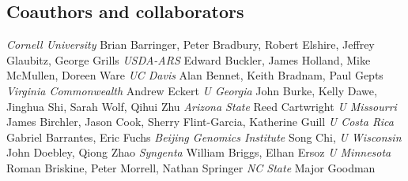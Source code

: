 \documentclass[11pt]{article}
\newcommand\e[1]{\emph{#1}}
\begin{document}
\subsection{Coauthors and collaborators}
\e{Cornell University} Brian Barringer, Peter Bradbury, Robert Elshire, Jeffrey Glaubitz, George Grills
\e{USDA-ARS} Edward Buckler, James Holland, Mike McMullen, Doreen Ware
\e{UC Davis} Alan Bennet, Keith Bradnam, Paul Gepts
\e{Virginia Commonwealth} Andrew Eckert
\e{U Georgia} John Burke, Kelly Dawe, Jinghua Shi, Sarah Wolf, Qihui Zhu
\e{Arizona State} Reed Cartwright
\e{U Missourri} James Birchler, Jason Cook, Sherry Flint-Garcia, Katherine Guill 
\e{U Costa Rica} Gabriel Barrantes, Eric Fuchs
\e{ Beijing Genomics Institute} Song Chi, 
\e{U Wisconsin} John Doebley, Qiong Zhao
\e{Syngenta} William Briggs, Elhan Ersoz
\e{U Minnesota} Roman Briskine, Peter Morrell, Nathan Springer 
\e{NC State} Major Goodman
\end{document}
